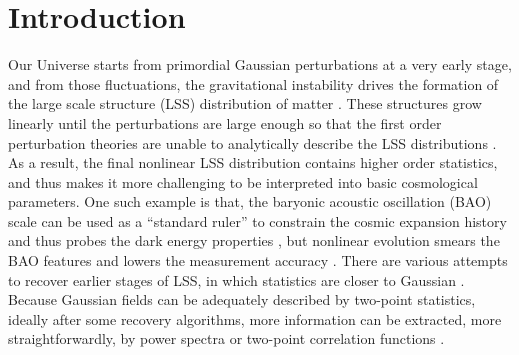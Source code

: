 \documentclass[aps,prd,twocolumn,superscriptaddress,amsfont,amssymb,amsmath,nofootinbib,showpacs,balancelastpage]{revtex4-1}
\begin{document}
\section{Introduction}\label{sec.intro}
Our Universe starts from primordial Gaussian perturbations at a very early stage,
and from those fluctuations, the gravitational instability drives the formation of
the large scale structure (LSS) distribution of matter
\citep{1970A&A.....5...84Z,1985ApJ...292..371D}.
These structures grow
linearly until the perturbations are large enough so that the first order
perturbation theories are unable to analytically describe the LSS distributions
\citep{2016JCAP...01..043M}.
As a result, the final nonlinear LSS distribution contains higher order
statistics, and thus makes it more challenging to be interpreted into basic
cosmological parameters. One such example is that, the baryonic acoustic oscillation (BAO)
scale can be used as a ``standard ruler'' to constrain the cosmic expansion history
and thus probes the dark energy properties \citep{2005NewAR..49..360E}, but
nonlinear evolution smears the BAO features and lowers the measurement
accuracy \citep{2005ApJ...633..560E,2012MNRAS.419.2949N}.
There are various attempts to recover earlier stages
of LSS, in which statistics are closer to Gaussian
\citep{1992MNRAS.254..315W,2013MNRAS.436..759H}.
Because Gaussian fields can be adequately described by two-point statistics,
ideally after some recovery algorithms, more information can be extracted,
more straightforwardly, by power spectra or two-point correlation functions
\citep{2005MNRAS.360L..82R,2012MNRAS.421..832Y}.
\end{document}
